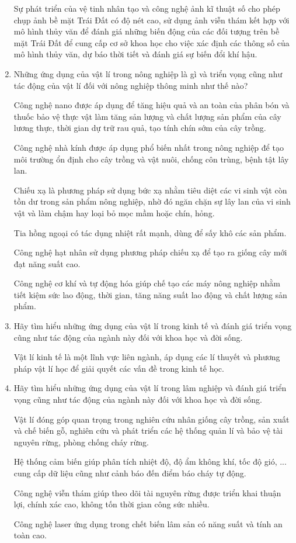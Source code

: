\begin{enumerate}[label=\bfseries Câu \arabic*:]
{		Sự phát triển của vệ tinh nhân tạo và công nghệ ảnh kĩ thuật số cho phép chụp ảnh bề mặt Trái Đất có độ nét cao, sử dụng ảnh viễn thám kết hợp với mô hình thủy văn để đánh giá những biến động của các đối tượng trên bề mặt Trái Đất để cung cấp cơ sở khoa học cho việc xác định các thông số của mô hình thủy văn, dự báo thời tiết và đánh giá sự biến đổi khí hậu.
	}
	\item {}
	
	
	{
		Những ứng dụng của vật lí trong nông nghiệp là gì và triển vọng cũng như tác động của vật lí đối với nông nghiệp thông minh như thế nào?
	}
	
	\hideall
	{
		Công nghệ nano được áp dụng để tăng hiệu quả và an toàn của phân bón và thuốc bảo vệ thực vật làm tăng sản lượng và chất lượng sản phẩm của cây lương thực, thời gian dự trữ rau quả, tạo tính chín sớm của cây trồng. 
		
		Công nghệ nhà kính được áp dụng phổ biến nhất trong nông nghiệp để tạo môi trường ổn định cho cây trồng và vật nuôi, chống côn trùng, bệnh tật lây lan.
		
		Chiếu xạ là phương pháp sử dụng bức xạ nhằm tiêu diệt các vi sinh vật còn tồn dư trong sản phẩm nông nghiệp, nhờ đó ngăn chặn sự lây lan của vi sinh vật và làm chậm hay loại bỏ mọc mầm hoặc chín, hỏng. 
		
		Tia hồng ngoại có tác dụng nhiệt rất mạnh, dùng để sấy khô các sản phẩm.
		
		Công nghệ hạt nhân sử dụng phương pháp chiếu xạ để tạo ra giống cây mới đạt năng suất cao.
		
		Công nghệ cơ khí và tự động hóa giúp chế tạo các máy nông nghiệp nhằm tiết kiệm sức lao động, thời gian, tăng năng suất lao động và chất lượng sản phẩm.
		
		
	}
	\item {}
	
	
	{
		Hãy tìm hiểu những ứng dụng của vật lí trong kinh tế và đánh giá triển vọng cũng như tác động của ngành này đối với khoa học và đời sống.
	}
	
	\hideall
	{
		Vật lí kinh tế là một lĩnh vực liên ngành, áp dụng các lí thuyết và phương pháp vật lí học để giải quyết các vấn đề trong kinh tế học.
	}
	\item {}
	
	
	{
		Hãy tìm hiểu những ứng dụng của vật lí trong lâm nghiệp và đánh giá triển vọng cũng như tác động của ngành này đối với khoa học và đời sống.
	}
	
	\hideall
	{
		Vật lí đóng góp quan trọng trong nghiên cứu nhân giống cây trồng, sản xuất và chế biến gỗ, nghiên cứu và phát triển các hệ thống quản lí và bảo vệ tài nguyên rừng, phòng chống cháy rừng.
		
		Hệ thống cảm biến giúp phân tích nhiệt độ, độ ẩm không khí, tốc độ gió, ... cung cấp dữ liệu cũng như cảnh báo đến điểm báo cháy tự động.
		
		Công nghệ viễn thám giúp theo dõi tài nguyên rừng được triển khai thuận lợi, chính xác cao, không tốn thời gian công sức nhiều.
		
		Công nghệ laser ứng dụng trong chết biến lâm sản có năng suất và tính an toàn cao. 
	}
\end{enumerate}